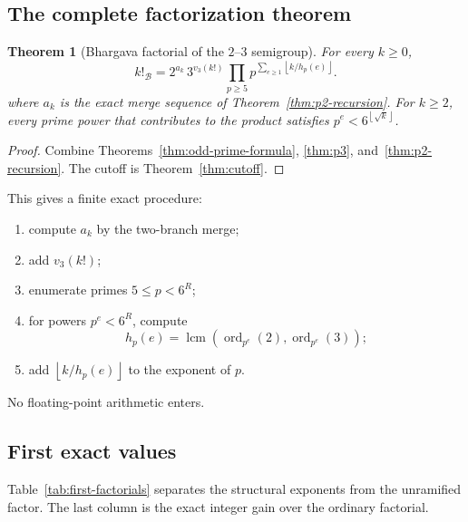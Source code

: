 \documentclass[11pt,oneside]{article}
\newtheorem{theorem}{Theorem}[section]
\theoremstyle{definition}
\theoremstyle{remark}
\newcommand{\B}{\mathcal B}
\newcommand{\ord}{\operatorname{ord}}
\newcommand{\lcm}{\operatorname{lcm}}
\newcommand{\floor}[1]{\left\lfloor #1\right\rfloor}
\begin{document}
\subsection{The complete factorization theorem}

\begin{theorem}[Bhargava factorial of the \(2\)--\(3\) semigroup]
\label{thm:global-factorial}
For every \(k\ge0\),
\begin{equation}
 \boxed{
 k!_{\B}
 =
 2^{a_k}\,
 3^{v_3(k!)}
 \prod_{p\ge5}
 p^{\displaystyle\sum_{e\ge1}\floor{k/h_p(e)}}.
 }
 \label{eq:global-factorial}
\end{equation}
where \(a_k\) is the exact merge sequence of
Theorem~\ref{thm:p2-recursion}.  For \(k\ge2\), every prime power that contributes to the
product satisfies \(p^e<6^{\floor{\sqrt{k}}}\).
\end{theorem}

\begin{proof}
Combine Theorems~\ref{thm:odd-prime-formula}, \ref{thm:p3},
and~\ref{thm:p2-recursion}.  The cutoff is Theorem~\ref{thm:cutoff}.
\end{proof}

This gives a finite exact procedure:

\begin{enumerate}
\item compute \(a_k\) by the two-branch merge;
\item add \(v_3(k!)\);
\item enumerate primes \(5\le p<6^R\);
\item for powers \(p^e<6^R\), compute
\[
 h_p(e)=\lcm(\ord_{p^e}(2),\ord_{p^e}(3));
\]
\item add \(\floor{k/h_p(e)}\) to the exponent of \(p\).
\end{enumerate}

No floating-point arithmetic enters.

\subsection{First exact values}

Table~\ref{tab:first-factorials} separates the structural exponents from the unramified
factor.  The last column is the exact integer gain over the ordinary factorial.
\end{document}
